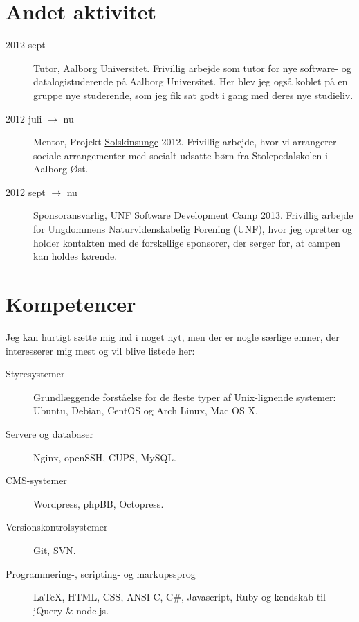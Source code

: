 \documentclass[margin,line,a4paper]{resume}
\begin{document}
\begin{resume}
\section{\mysidestyle Andet aktivitet}\vspace{1mm}
\begin{description}
  \item[2012 sept] Tutor, Aalborg Universitet. Frivillig arbejde som tutor for
    nye software- og datalogistuderende på Aalborg Universitet. Her blev jeg også koblet på en
    gruppe nye studerende, som jeg fik sat godt i gang med deres nye studieliv.
  \item[2012 juli $\rightarrow$ nu] Mentor, Projekt \href{http://www.urk.dk/solskinsunge/}{Solskinsunge} 2012. Frivillig arbejde,
    hvor vi arrangerer sociale arrangementer med socialt udsatte børn fra Stolepedalskolen
    i Aalborg Øst.
  \item[2012 sept $\rightarrow$ nu] Sponsoransvarlig, UNF Software Development Camp 2013. Frivillig
    arbejde for Ungdommens Naturvidenskabelig Forening (UNF), hvor jeg opretter og holder
    kontakten med de forskellige sponsorer, der sørger for, at campen kan holdes
    kørende.
\end{description}

\section{\mysidestyle Kompetencer}\vspace{1mm} Jeg kan
hurtigt sætte mig ind i noget nyt, men der er nogle særlige emner, der
interesserer mig mest og vil blive listede her:
\vspace{0.5cm}
\begin{description}

  \item[Styresystemer] Grundlæggende forståelse for de fleste
    typer af Unix-lignende systemer: Ubuntu, Debian, CentOS og Arch Linux, Mac OS X.

  \item[Servere og databaser] Nginx, openSSH, CUPS, MySQL.

  \item[CMS-systemer] Wordpress, phpBB, Octopress.

  \item[Versionskontrolsystemer] Git, SVN.

  \item[Programmering-, scripting- og markupssprog] \LaTeX,
    HTML, CSS, ANSI C, C\#, Javascript, Ruby og kendskab til jQuery \& node.js.


\end{description}
\end{resume}
\end{document}
